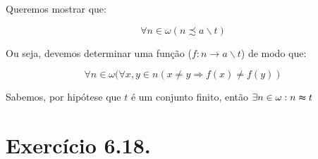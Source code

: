 \documentclass[12pt]{extarticle}
\begin{document}
Queremos mostrar que:

$$
\forall n \in \omega (n \precsim a  \backslash t)
$$

Ou seja, devemos determinar uma função ($f:n \rightarrow a \backslash t$) de modo que:

$$
\forall n \in \omega (\forall x,y \in n  (x \neq y \Rightarrow f(x) \neq f(y))
$$

Sabemos, por hipótese que $t$ é um conjunto finito, então $\exists n \in \omega: n \thickapprox t$

\section{Exercício 6.18.}
\end{document}
